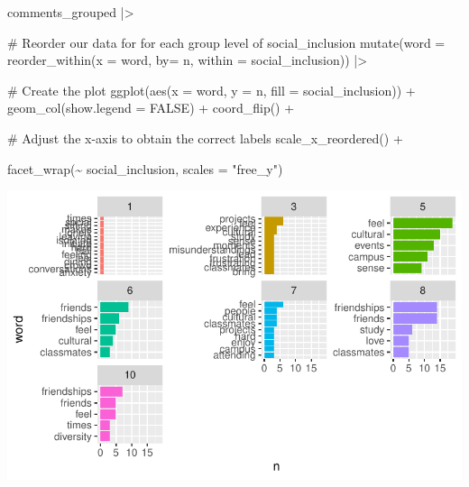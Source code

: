 \documentclass[
  letterpaper,
  DIV=11,
  numbers=noendperiod]{scrreprt}
\newenvironment{Shaded}{\begin{snugshade}}{\end{snugshade}}
\newcommand{\AttributeTok}[1]{\textcolor[rgb]{0.40,0.45,0.13}{#1}}
\newcommand{\CommentTok}[1]{\textcolor[rgb]{0.37,0.37,0.37}{#1}}
\newcommand{\ConstantTok}[1]{\textcolor[rgb]{0.56,0.35,0.01}{#1}}
\newcommand{\FunctionTok}[1]{\textcolor[rgb]{0.28,0.35,0.67}{#1}}
\newcommand{\NormalTok}[1]{\textcolor[rgb]{0.00,0.23,0.31}{#1}}
\newcommand{\SpecialCharTok}[1]{\textcolor[rgb]{0.37,0.37,0.37}{#1}}
\newcommand{\StringTok}[1]{\textcolor[rgb]{0.13,0.47,0.30}{#1}}
\begin{document}
\begin{Shaded}
\begin{Highlighting}[]
\NormalTok{comments\_grouped }\SpecialCharTok{|\textgreater{}}
  
  \CommentTok{\# Reorder our data for for each group level of social\_inclusion}
  \FunctionTok{mutate}\NormalTok{(}\AttributeTok{word =} \FunctionTok{reorder\_within}\NormalTok{(}\AttributeTok{x =}\NormalTok{ word,}
                               \AttributeTok{by=}\NormalTok{ n,}
                               \AttributeTok{within =}\NormalTok{ social\_inclusion)) }\SpecialCharTok{|\textgreater{}}

 \CommentTok{\# Create the plot}
    \FunctionTok{ggplot}\NormalTok{(}\FunctionTok{aes}\NormalTok{(}\AttributeTok{x =}\NormalTok{ word,}
               \AttributeTok{y =}\NormalTok{ n,}
               \AttributeTok{fill =}\NormalTok{ social\_inclusion)) }\SpecialCharTok{+}
  \FunctionTok{geom\_col}\NormalTok{(}\AttributeTok{show.legend =} \ConstantTok{FALSE}\NormalTok{) }\SpecialCharTok{+}
  \FunctionTok{coord\_flip}\NormalTok{() }\SpecialCharTok{+}

  \CommentTok{\# Adjust the x{-}axis to obtain the correct labels    }
  \FunctionTok{scale\_x\_reordered}\NormalTok{() }\SpecialCharTok{+}
      
  \FunctionTok{facet\_wrap}\NormalTok{(}\SpecialCharTok{\textasciitilde{}}\NormalTok{ social\_inclusion,}
             \AttributeTok{scales =} \StringTok{"free\_y"}\NormalTok{)}
\end{Highlighting}
\end{Shaded}

\includegraphics{14_mixed_methods_files/figure-pdf/visualise-social-inclusion-groups-words-n-04-1.pdf}
\end{document}

